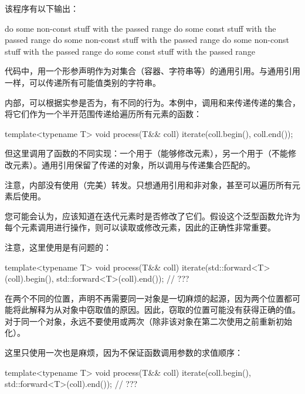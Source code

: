 该程序有以下输出：

\begin{outputcode}
do some non-const stuff with the passed range
do some const stuff with the passed range
do some non-const stuff with the passed range
do some non-const stuff with the passed range
do some const stuff with the passed range
\end{outputcode}

代码中，用一个形参声明作为对集合（容器、字符串等）的通用引用。与通用引用一样，可以传递所有可能值类别的字符串。

内部，可以根据实参是否为，有不同的行为。本例中，调用和来传递传递的集合，将它们作为一个半开范围传递给遍历所有元素的函数：

\begin{cppcode}
template<typename T>
void process(T&& coll)
{
	iterate(coll.begin(), coll.end());
}
\end{cppcode}

但这里调用了函数的不同实现：一个用于（能够修改元素），另一个用于（不能修改元素）。通用引用保留了传递的对象，所以调用与传递集合匹配的。

注意，内部没有使用（完美）转发。只想通用引用和非对象，甚至可以遍历所有元素后使用。

您可能会认为，应该知道在迭代元素时是否修改了它们。假设这个泛型函数允许为每个元素调用进行操作，则可以读取或修改元素，因此的正确性非常重要。

注意，这里使用是有问题的：

\begin{cppcode}
template<typename T>
void process(T&& coll)
{
	iterate(std::forward<T>(coll).begin(), std::forward<T>(coll).end()); // ???
}
\end{cppcode}

在两个不同的位置，声明不再需要同一对象是一切麻烦的起源，因为两个位置都可能将此解释为从对象中窃取值的原因。因此，窃取的位置可能没有获得正确的值。对于同一个对象，永远不要使用或两次（除非该对象在第二次使用之前重新初始化）。

这里只使用一次也是麻烦，因为不保证函数调用参数的求值顺序：

\begin{cppcode}
template<typename T>
void process(T&& coll)
{
	iterate(coll.begin(), std::forward<T>(coll).end()); // ???
}
\end{cppcode}

